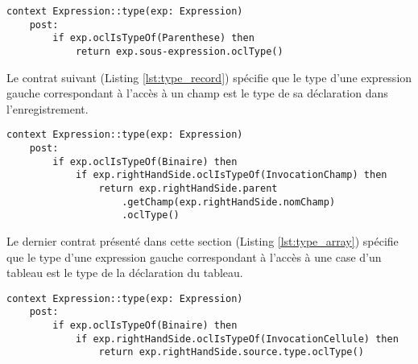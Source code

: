 \begin{lstlisting}[caption=Contrat OCL sur le type parenthèsée,captionpos=b,label={lst:type_paranthese},language=OCL]
context Expression::type(exp: Expression)
	post:
		if exp.oclIsTypeOf(Parenthese) then
			return exp.sous-expression.oclType()
\end{lstlisting}

Le contrat suivant (Listing \ref{lst:type_record}) spécifie que le type d'une expression gauche correspondant à l'accès à un champ est le type de sa déclaration dans l'enregistrement.

\begin{lstlisting}[caption=Contrat OCL sur le type d'un enregistrement,captionpos=b,label={lst:type_record},language=OCL]
context Expression::type(exp: Expression)
	post:
		if exp.oclIsTypeOf(Binaire) then
			if exp.rightHandSide.oclIsTypeOf(InvocationChamp) then
				return exp.rightHandSide.parent
					.getChamp(exp.rightHandSide.nomChamp)
					.oclType()
\end{lstlisting}

Le dernier contrat présenté dans cette section (Listing \ref{lst:type_array}) spécifie que le type d'une expression gauche correspondant à l'accès à une case d'un tableau est le type de la déclaration du tableau.

\begin{lstlisting}[caption=Contrat OCL sur le type d'un tableau,captionpos=b,label={lst:type_array},language=OCL]
context Expression::type(exp: Expression)
	post:
		if exp.oclIsTypeOf(Binaire) then
			if exp.rightHandSide.oclIsTypeOf(InvocationCellule) then
				return exp.rightHandSide.source.type.oclType()
\end{lstlisting}
